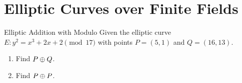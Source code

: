 \section{Elliptic Curves over Finite Fields}

\begin{example}
    {Elliptic Addition with Modulo} Given the elliptic curve \(E \colon y^{2} = x^{3} + 2x + 2 \pmod{17}\) with points \(P = (5,1)\) and \(Q = (16,13)\).
    \begin{enumerate}[label=(\alph*)]
        \item Find \(P \oplus Q\).
        \item Find \(P \oplus P\).
    \end{enumerate}

\end{example}

